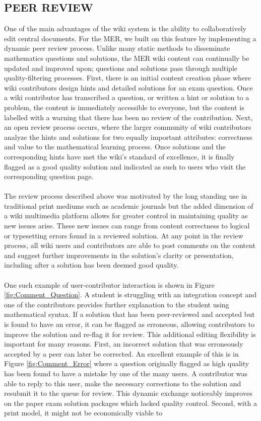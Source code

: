 \documentclass{primus}
\begin{document}
\subsection{PEER REVIEW}\label{sec:Peer_Review}
One of the main advantages of the wiki system is the ability to collaboratively edit central documents.  For the MER, we built on this feature by implementing a dynamic peer review process. Unlike many static methods to disseminate mathematics questions and solutions, the MER wiki content can continually be updated and improved upon; questions and solutions pass through multiple quality-filtering processes.  First, there is an initial content creation phase where wiki contributors design hints and detailed solutions for an exam question.   Once a wiki contributor has transcribed a question, or written a hint or solution to a problem, the content is immediately accessible to everyone, but the content is labelled with a warning that there has been no review of the contribution.  Next, an open review process occurs, where the larger community of wiki contributors analyze the hints and solutions for two equally important attributes: correctness and value to the mathematical learning process.  Once solutions and the corresponding hints have met the wiki’s standard of excellence, it is finally flagged as a good quality solution and indicated as such to users who visit the corresponding question page.
\\\\
\noindent{}The review process described above was motivated by the long standing use in traditional print mediums such as academic journals but the added dimension of a wiki multimedia platform allows for greater control in maintaining quality as new issues arise.  These new issues can range from content correctness to logical or typesetting errors found in a reviewed solution. At any point in the review process, all wiki users and contributors are able to post comments on the content and suggest further improvements in the solution’s clarity or presentation, including after a solution has been deemed good quality.
\\\\
\noindent{}One such example of user-contributor interaction is shown in Figure \ref{fig:Comment_Question}.  A student is struggling with an integration concept and one of the contributors provides further explanation to the student using mathematical syntax.  If a solution that has been peer-reviewed and accepted but is found to have an error, it can be flagged as erroneous, allowing contributors to improve the solution and re-flag it for review.  This additional editing flexibility is important for many reasons.  First, an incorrect solution that was erroneously accepted by a peer can later be corrected.  An excellent example of this is in Figure \ref{fig:Comment_Error} where a question originally flagged as high quality has been found to have a mistake by one of the many users.  A contributor was able to reply to this user, make the necessary corrections to the solution and resubmit it to the queue for review.  This dynamic exchange noticeably improves on the paper exam solution packages which lacked quality control. Second, with a print model, it might not be economically viable to
\end{document}
